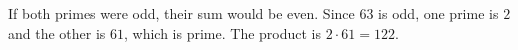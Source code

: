 If both primes were odd, their sum would be even. Since $63$ is odd, one prime is $2$ and the other is $61$, which is prime. The product is $2\cdot61=\boxed{122}$.
